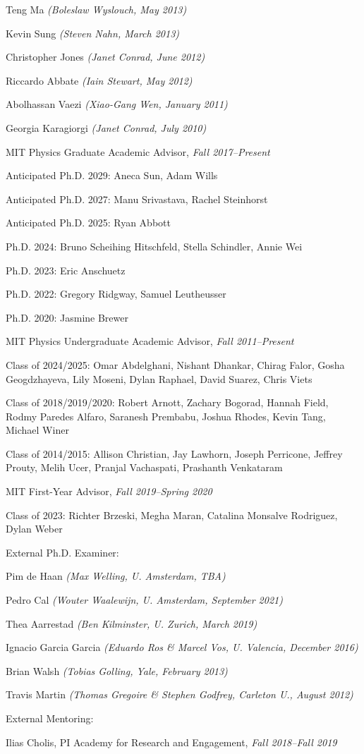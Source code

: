 \item Teng Ma \textit{(Boleslaw Wyslouch, May 2013)}
\item Kevin Sung \textit{(Steven Nahn, March 2013)}
\item Christopher Jones \textit{(Janet Conrad, June 2012)}
\item Riccardo Abbate \textit{(Iain Stewart, May 2012)}
\item Abolhassan Vaezi \textit{(Xiao-Gang Wen, January 2011)}
\item Georgia Karagiorgi \textit{(Janet Conrad, July 2010)}
\el 
\item MIT Physics Graduate Academic Advisor, \emph{Fall 2017--Present}
\bsbl 
\item Anticipated Ph.D. 2029: Aneca Sun, Adam Wills
\item Anticipated Ph.D. 2027: Manu Srivastava, Rachel Steinhorst
\item Anticipated Ph.D. 2025: Ryan Abbott
\item Ph.D. 2024: Bruno Scheihing Hitschfeld, Stella Schindler, Annie Wei
\item Ph.D. 2023: Eric Anschuetz
\item Ph.D. 2022: Gregory Ridgway, Samuel Leutheusser
\item Ph.D. 2020: Jasmine Brewer
\el 
\item MIT Physics Undergraduate Academic Advisor, \emph{Fall 2011--Present}
\bsbl 
\item Class of 2024/2025: Omar Abdelghani, Nishant Dhankar, Chirag Falor, Gosha Geogdzhayeva, Lily Moseni, Dylan Raphael, David Suarez, Chris Viets
\item Class of 2018/2019/2020: Robert Arnott, Zachary Bogorad, Hannah Field, Rodmy Paredes Alfaro, Saranesh Prembabu, Joshua Rhodes, Kevin Tang, Michael Winer
\item Class of 2014/2015: Allison Christian, Jay Lawhorn, Joseph Perricone, Jeffrey Prouty, Melih Ucer, Pranjal Vachaspati, Prashanth Venkataram
\el 
\item MIT First-Year Advisor, \emph{Fall 2019--Spring 2020}
\bsbl 
\item Class of 2023: Richter Brzeski, Megha Maran, Catalina Monsalve Rodriguez, Dylan Weber
\el 

\item External Ph.D. Examiner:
\bsbl 
\item Pim de Haan \textit{(Max Welling, U. Amsterdam, TBA)}
\item Pedro Cal \textit{(Wouter Waalewijn, U. Amsterdam, September 2021)}
\item Thea Aarrestad \textit{(Ben Kilminster, U. Zurich, March 2019)}
\item Ignacio Garcia Garcia \textit{(Eduardo Ros \& Marcel Vos, U. Valencia, December 2016)}
\item Brian Walsh \textit{(Tobias Golling, Yale, February 2013)}
\item Travis Martin \textit{(Thomas Gregoire \& Stephen Godfrey, Carleton U., August 2012)}
\el 
\item External Mentoring:
\bsbl 
\item Ilias Cholis, PI Academy for Research and Engagement, \emph{Fall 2018--Fall 2019}
\el 
\el
